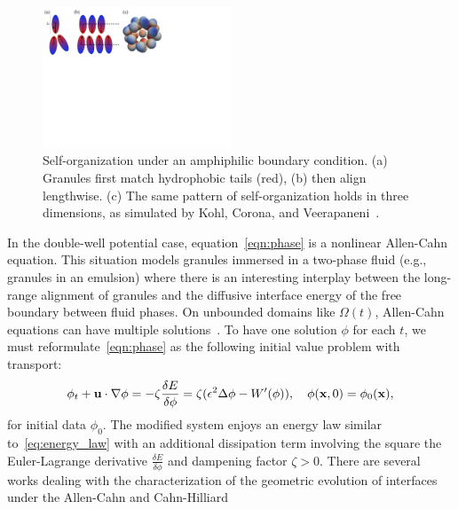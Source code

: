 \begin{figure}
  \vspace{-8pt}
  \centerline{\includegraphics[width=0.5\textwidth]{figures/SA1Figures/AmphiphilicAssembly.pdf}}
  \vspace{-8pt}
  \caption{\label{fig:amphiphilic_assembly} \footnotesize
  Self-organization under an amphiphilic boundary condition. (a)
  Granules first match hydrophobic tails (red), (b) then align
  lengthwise. (c) The same pattern of self-organization holds in three
  dimensions, as simulated by Kohl, Corona, and
  Veerapaneni~\cite{koh-cor-che-vee2021}.}
\end{figure}
In the double-well potential case, equation~\eqref{eqn:phase} is a
nonlinear Allen-Cahn equation. This situation models granules immersed
in a two-phase fluid (e.g., granules in an emulsion) where there is an
interesting interplay between the long-range alignment of granules and
the diffusive interface energy of the free boundary between fluid
phases. On unbounded domains like $\Omega(t)$, Allen-Cahn equations can
have multiple solutions~\cite{Alama1997StationaryLS,
Alikakos2008OnAE, Bronsard1993OnTB, Byeon2014SolutionsOH, Byeon2013OnAP,
Alessio2005ENTIRESI, Trumper2007ExistenceOA, Benci2019MultipleSF}.
To have one solution $\phi$ for each $t$, 
we must reformulate~\eqref{eqn:phase} as
the following initial value problem with transport:
\begin{align}
  \label{eqn:phase_transport}
  \phi_t + \mathbf{u} \cdot \nabla \phi
  = -\zeta \frac{\delta E}{\delta \phi}
  = \zeta(\epsilon^2 \Delta \phi - W'(\phi)),
  \quad \phi(\mathbf{x},0) = \phi_0(\mathbf{x}),
\end{align}
for initial data $\phi_0$. The modified system enjoys an energy law
similar to~\eqref{eq:energy_law} with an additional dissipation term
involving the square the Euler-Lagrange derivative $\frac{\delta
E}{\delta \phi}$ and dampening factor $\zeta > 0$. There are several
works dealing with the characterization of the geometric evolution of
interfaces under the Allen-Cahn and Cahn-Hilliard
